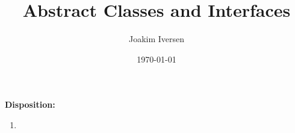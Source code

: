 \documentclass{article}
\title{Abstract Classes and Interfaces}
\author{Joakim Iversen}
\date{\today}
\begin{document}
\maketitle
\newpage

\textbf{\Large Disposition:}
\begin{enumerate}
    \item 
\end{enumerate}
\end{document}
